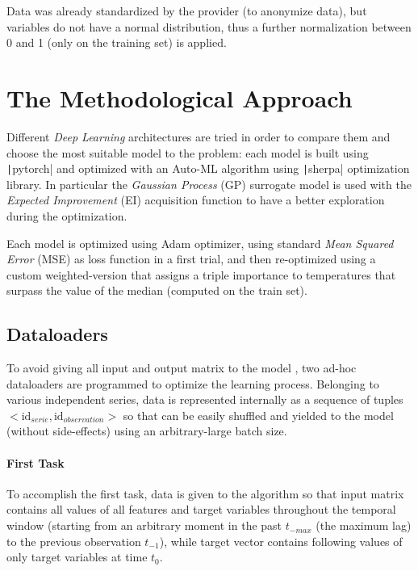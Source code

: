 Data was already standardized by the provider (to anonymize data), but variables do not have a normal distribution, thus a further normalization between 0 and 1 (only on the training set) is applied.\\

\section{The Methodological Approach}
Different \textit{Deep Learning} architectures are tried in order to compare them and choose the most suitable model to the problem: each model is built using \texttt|pytorch| and optimized with an Auto-ML algorithm using \texttt|sherpa| optimization library. In particular the \textit{Gaussian Process} (GP) surrogate model is used with the \textit{Expected Improvement} (EI) acquisition function to have a better exploration during the optimization.

Each model is optimized using Adam optimizer, using standard \textit{Mean Squared Error} (MSE) as loss function in a first trial, and then re-optimized using a custom weighted-version that assigns a triple importance to temperatures that surpass the value of the median (computed on the train set).

\subsection{Dataloaders}
To avoid giving all input and output matrix to the model  %
, two ad-hoc dataloaders are programmed to optimize the learning process.
Belonging to various independent series, data is represented internally as a sequence of tuples $<\text{id}_{serie}, \text{id}_{observation}>$ so that can be easily shuffled and yielded to the model (without side-effects) using an arbitrary-large batch size.

\paragraph{First Task}
To accomplish the first task, data is given to the algorithm so that input matrix contains all values of all features and target variables throughout the temporal window (starting from an arbitrary moment in the past $t_{-max}$ (the maximum lag) to the previous observation $t_{-1}$), while target vector contains following values of only target variables at time $t_0$.

